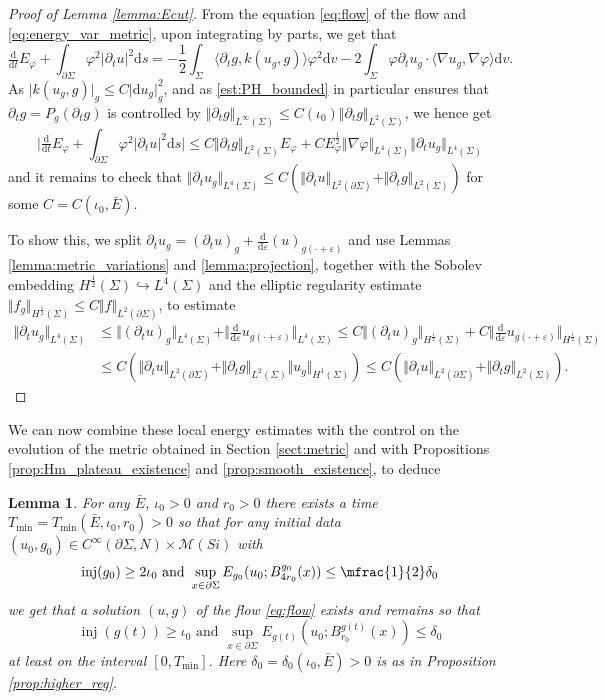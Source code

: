 \documentclass[10pt,reqno]{amsart}
\theoremstyle{plain}
\newtheorem{lemma}{Lemma}[section]
\theoremstyle{definition}
\numberwithin{equation}{section}
\newcommand{\de}{\delta}
\newcommand{\Si}{\Sigma}
\newcommand{\vph}{\varphi}
\newcommand{\ep}{\varepsilon}
\newcommand{\embed}{\hookrightarrow}
\DeclareMathOperator{\inj}{inj}
\newcommand{\norm}[1]{\Vert#1\Vert}
\newcommand{\beq}{\begin{equation}}
\newcommand{\eeq}{\end{equation}}
\newcommand{\beqs}{\begin{equation*}}
\newcommand{\eeqs}{\end{equation*}}
\newcommand{\half}{\frac{1}{2}}
\newcommand{\mhalf}{\mfrac{1}{2}}
\newcommand{\dd}{\mathrm{d}} %
\newcommand{\pt}{\partial_t}
\newcommand{\abs}[1]{\vert#1\vert}
\newcommand{\pSi}{{\partial \Sigma}}
\newcommand{\MM}{\mathcal{M}} %
\newcommand{\Ecut}{E_\varphi}
\newcommand{\hf}{\frac{1}{2}} %
\newcommand{\p}{\partial} %
\newcommand{\inner}[2]{\langle #1, #2\rangle} %
\begin{document}
\begin{proof}[Proof of Lemma \ref{lemma:Ecut}]
	From the equation \eqref{eq:flow} of the flow and \eqref{eq:energy_var_metric}, upon integrating by parts, we get that 
	\beqs
	    \tfrac{\dd}{\dd t} \Ecut+\int_{\pSi}\varphi^2 \abs{\partial_t u}^2 \dd s=-\half \int_{\Si}\inner{\pt g}{k(u_g,g)} \vph^2 \dd v - 2\int_{\Si} \vph \p_t u_g \cdot \inner{\nabla u_g}{\nabla \vph} \dd v.
	\eeqs
	As $\abs{k(u_g,g)}_g \leq C\abs{\dd u_g}_g^2$, and as \eqref{est:PH_bounded} in particular ensures that  $\p_tg=P_g(\pt g)$ is controlled by  $\norm{\pt g}_{L^\infty(\Si)}\leq C(\iota_0) \norm{\pt g}_{L^2(\Si)}$, we hence get
	\beqs
	    \bigg| \tfrac{\dd}{\dd t} \Ecut+\int_{\pSi}\varphi^2 \abs{\partial_t u}^2 \dd s \bigg|\leq C  \norm{\pt g}_{L^2(\Si)}\Ecut +C \Ecut^\half  \norm{\nabla \vph}_{L^4(\Si)} \norm{\pt u_g}_{L^4(\Si)}
	\eeqs
	and it remains to check that $\norm{\pt u_g}_{L^4(\Si)}\leq C (\norm{\pt u}_{L^2(\pSi)}+ \norm{\pt g}_{L^2(\Si)})$ for some $C=C(\iota_0,\bar{E})$. 
	
	To show this, we split $\pt u_g = (\pt u)_g + \tfrac{\dd}{\dd \ep} (u)_{g(\cdot+\ep)}$ and use Lemmas \ref{lemma:metric_variations} and \ref{lemma:projection}, together with the Sobolev embedding $H^\hf(\Si) \embed L^4(\Si)$ and the elliptic regularity estimate $\norm{f_g}_{H^\hf(\Si)} \leq C\norm{f}_{L^2(\p\Si)}$, to estimate
	\begin{align*}
        \norm{\p_t u_g}_{L^4(\Si)} &\leq \norm{(\pt u)_g}_{L^4(\Si)} + \norm{\tfrac{\dd}{\dd \ep} u_{g(\cdot+\ep)}}_{L^4(\Si)} \leq C\norm{(\p_t u)_g}_{H^\hf(\Si)} + C\norm{\tfrac{\dd}{\dd \ep} u_{g(\cdot+\ep)}}_{H^\hf(\Si)}\\
        &\leq C\left(\norm{\p_t u}_{L^2(\p\Si)} +  \norm{\pt g}_{L^2(\Si)}\norm{u_g}_{H^1(\Si)}\right)	\leq C\left(\norm{\p_t u}_{L^2(\p\Si)} +  \norm{\pt g}_{L^2(\Si)}\right).
	\end{align*}
\end{proof}

We can now combine these local energy estimates with the control on the evolution of the metric obtained in Section \ref{sect:metric} and with Propositions \ref{prop:Hm_plateau_existence} and \ref{prop:smooth_existence}, to deduce

\begin{lemma}\label{lemma:Tmin}
    For any $\bar E$, $\iota_0>0$ and $r_0>0$ there exists a time $T_{\min}=T_{\min}(\bar E,\iota_0,r_0)>0$ so that for any initial data $(u_0,g_0)\in C^\infty(\pSi,N)\times \MM(Si)$ with 
    \beq
        \inj(g_0)\geq 2\iota_0 \text{ and } \sup_{x\in \pSi}  E_{g_0}(u_0; B_{4r_0}^{g_0}(x))\leq \mhalf \de_0
    \eeq
    we get that a solution $(u,g)$ of the flow \eqref{eq:flow} exists and remains so that 
    \beq\label{claim:exist-Tmin}
        \inj(g(t))\geq \iota_0 \text{ and } \sup_{x\in \pSi} E_{g(t)}(u_0; B_{r_0}^{g(t)}(x))\leq \de_0 
    \eeq
    at least on the interval $[0,T_{\min}]$. Here $\de_0 = \de_0(\iota_0,\bar E)>0$ is as in Proposition \ref{prop:higher_reg}.
\end{lemma}
\end{document}
